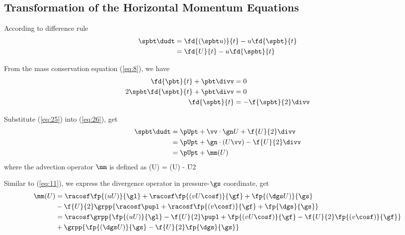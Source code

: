 \subsection{Transformation of the Horizontal Momentum Equations } \label{der:hor-mom2-sig}

According to difference rule
\begin{align}
\spbt\dudt &= \fd{(\spbt u)}{t} - u\fd{\spbt}{t} \notag\\
&= \fd{U}{t} - u\fd{\spbt}{t} \label{eq:26}
\end{align}

From the mass conservation equation (\ref{eq:8}), we have
\begin{align}
\fd{\pbt}{t} + \pbt\divv &= 0 \notag\\
2\spbt\fd{\spbt}{t} + \pbt\divv &= 0 \notag\\
\fd{\spbt}{t} &= -\f{\spbt}{2}\divv \label{eq:25}
\end{align}

Substitute (\ref{eq:25}) into (\ref{eq:26}), get
\begin{align}
\spbt\dudt &= \pUpt + \vv\cdot\gn U + \f{U}{2}\divv \notag\\
&= \pUpt + \gn\cdot(U\vv) - \f{U}{2}\divv \notag\\
&= \pUpt + \mm(U)
\end{align}
where the advection operator $\mm$ is defined as
\beeq \label{eq:29}
\mm(U) = \gn\cdot(U\vv) - \f{U}{2}\divv
\eneq

Similar to (\ref{eq:11}), we express the divergence operator in pressure-$\gs$
coordinate, get
\begin{align}
\mm(U) &= \racosf\fp{(uU)}{\gl} + \racosf\fp{(vU\cosf)}{\gf} + \fp{(\dgs U)}{\gs}
\notag\\
&- \f{U}{2}\grpp{ \racosf \pupl + \racosf \fp{(v\cosf)}{\gf} + \fp{\dgs}{\gs} }
\notag\\
&= \racosf \grpp{ \fp{(uU)}{\gl} - \f{U}{2}\pupl + \fp{(vU\cosf)}{\gf} -
\f{U}{2} \fp{(v\cosf)}{\gf} } \notag\\
&+\grpp{ \fp{(\dgs U)}{\gs} - \f{U}{2}\fp{\dgs}{\gs} }
\end{align}
